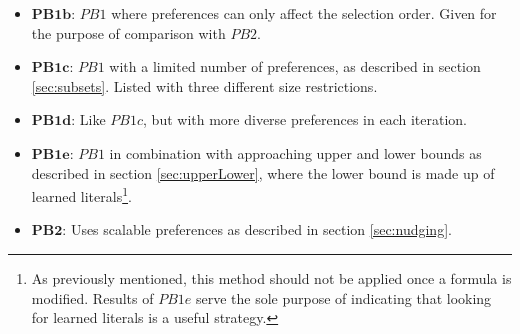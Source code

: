 \begin{itemize}
\item $\boldsymbol{PB1b}$: $PB1$ where preferences can only affect the selection order. Given for the purpose of comparison with $PB2$.
\item $\boldsymbol{PB1c}$: $PB1$ with a limited number of preferences, as described in section \ref{sec:subsets}. Listed with three different size restrictions.
\item $\boldsymbol{PB1d}$: Like $PB1c$, but with more diverse preferences in each iteration.
\item $\boldsymbol{PB1e}$: $PB1$ in combination with approaching upper and lower bounds as described in section \ref{sec:upperLower}, where the lower bound is made up of learned literals\footnote{As previously mentioned, this method should not be applied once a formula is modified. Results of $PB1e$ serve the sole purpose of indicating that looking for learned literals is a useful strategy.}.
\item $\boldsymbol{PB2}$: Uses scalable preferences as described in section \ref{sec:nudging}.
\end{itemize}







